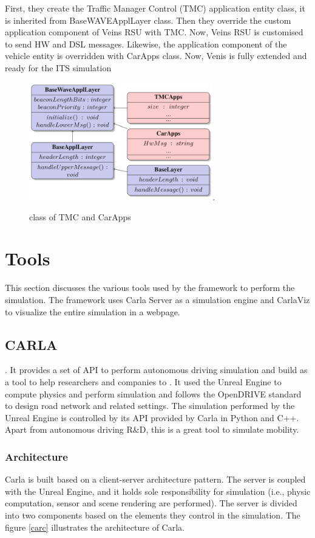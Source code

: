 First, they create the Traffic Manager Control (TMC) application entity class, it is inherited from BaseWAVEApplLayer class. Then they override the custom application component of Veins RSU with TMC. Now, Veins RSU is customised to send HW and DSL messages. Likewise, the application component of the vehicle entity is overridden with CarApps class. Now, Venis is fully extended and ready for the ITS simulation

\begin{figure}[h!]
    \centering
    \includegraphics[width=8cm]{Framework/Images/veinsExt.png}.
    \caption{ class of TMC and CarApps  \cite{veins}}
    \label{vExt}
\end{figure}

\section{Tools}
This section discusses the various tools used by the framework to perform the simulation. The framework uses Carla Server as a simulation engine and CarlaViz to visualize the entire simulation in a webpage.
\subsection{CARLA}
 \cite{carla_simulator_2020}. It provides a set of API to perform autonomous driving simulation and build as a tool to help researchers and companies to  \cite{carla_simulator_2020}. It used the Unreal Engine to compute physics and perform simulation and follows the OpenDRIVE standard to design road network and related settings. The simulation performed by the Unreal Engine is controlled by its API provided by Carla in Python and C++. Apart from autonomous driving R&D,  this is a great tool to simulate mobility.

\subsubsection{Architecture}
Carla is built based on a client-server architecture pattern. The server is coupled with the Unreal Engine, and it holds sole responsibility for simulation (i.e., physic computation, sensor and scene rendering are performed). The server is divided into two components based on the elements they control in the simulation. The figure \ref{carc} illustrates the architecture of Carla. 

